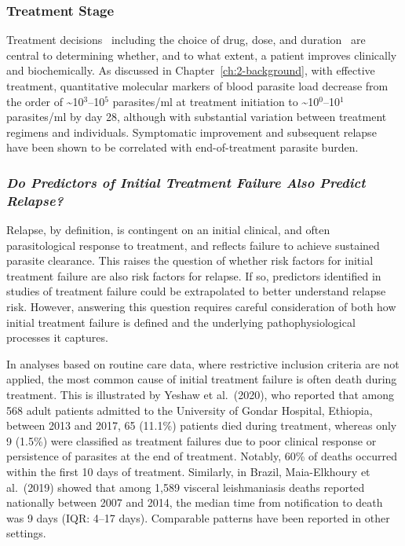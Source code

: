 \subsubsection{Treatment Stage}

Treatment decisions \textemdash\ including the choice of drug, dose, and duration \textemdash\ are central to determining whether, and to what extent, a patient improves clinically and biochemically. As discussed in Chapter~\ref{ch:2-background}, with effective treatment, quantitative molecular markers of blood parasite load decrease from the order of \textasciitilde 10$^3$--10$^5$ parasites/ml at treatment initiation to \textasciitilde 10$^0$--10$^1$ parasites/ml by day 28, although with substantial variation between treatment regimens and individuals. Symptomatic improvement and subsequent relapse have been shown to be correlated with end-of-treatment parasite burden\cite{sudarshan2011,verrest2021,verrest2024,takele2023}.

\subsubsection{\textit{Do Predictors of Initial Treatment Failure Also Predict Relapse?}}

Relapse, by definition, is contingent on an initial clinical, and often parasitological response to treatment, and reflects failure to achieve sustained parasite clearance. This raises the question of whether risk factors for initial treatment failure are also risk factors for relapse. If so, predictors identified in studies of treatment failure could be extrapolated to better understand relapse risk. However, answering this question requires careful consideration of both how initial treatment failure is defined and the underlying pathophysiological processes it captures.

In analyses based on routine care data, where restrictive inclusion criteria are not applied, the most common cause of initial treatment failure is often death during treatment. This is illustrated by Yeshaw et al.\ (2020)\cite{yeshawIncidenceMortalityIts2020}, who reported that among 568 adult patients admitted to the University of Gondar Hospital, Ethiopia, between 2013 and 2017, 65 (11.1\%) patients died during treatment, whereas only 9 (1.5\%) were classified as treatment failures due to poor clinical response or persistence of parasites at the end of treatment. Notably, 60\% of deaths occurred within the first 10 days of treatment. Similarly, in Brazil, Maia-Elkhoury et al.\ (2019)\cite{maia-elkhoury2019} showed that among 1,589 visceral leishmaniasis deaths reported nationally between 2007 and 2014, the median time from notification to death was 9 days (IQR: 4--17 days). Comparable patterns have been reported in other settings\cite{kaminkClinicalSeverityScoring2017,werneckPrognosticFactorsDeath2003,alemu2023}.

